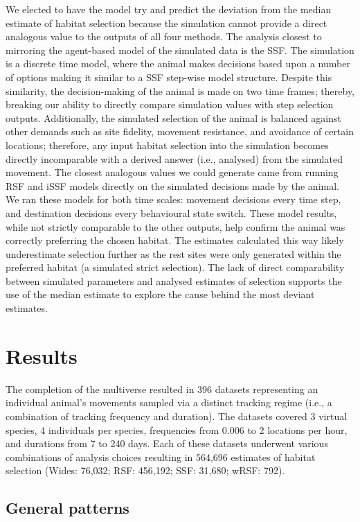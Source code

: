 \documentclass[10pt,a4paper]{article}
\begin{document}
We elected to have the model try and predict the deviation from the median estimate of habitat selection because the simulation cannot provide a direct analogous value to the outputs of all four methods.
The analysis closest to mirroring the agent-based model of the simulated data is the SSF.
The simulation is a discrete time model, where the animal makes decisions based upon a number of options making it similar to a SSF step-wise model structure.
Despite this similarity, the decision-making of the animal is made on two time frames; thereby, breaking our ability to directly compare simulation values with step selection outputs.
Additionally, the simulated selection of the animal is balanced against other demands such as site fidelity, movement resistance, and avoidance of certain locations; therefore, any input habitat selection into the simulation becomes directly incomparable with a derived answer (i.e., analysed) from the simulated movement.
The closest analogous values we could generate came from running RSF and iSSF models directly on the simulated decisions made by the animal.
We ran these models for both time scales: movement decisions every time step, and destination decisions every behavioural state switch.
These model results, while not strictly comparable to the other outputs, help confirm the animal was correctly preferring the chosen habitat.
The estimates calculated this way likely underestimate selection further as the rest sites were only generated within the preferred habitat (a simulated strict selection).
The lack of direct comparability between simulated parameters and analysed estimates of selection supports the use of the median estimate to explore the cause behind the most deviant estimates.

\section{Results}\label{results}

The completion of the multiverse resulted in 396 datasets representing an individual animal's movements sampled via a distinct tracking regime (i.e., a combination of tracking frequency and duration).
The datasets covered 3 virtual species, 4 individuals per species, frequencies from 0.006 to 2 locations per hour, and durations from 7 to 240 days.
Each of these datasets underwent various combinations of analysis choices resulting in
564,696 estimates of habitat selection (Wides: 76,032; RSF: 456,192; SSF: 31,680; wRSF: 792).

\subsection{General patterns}\label{general-patterns}
\end{document}
